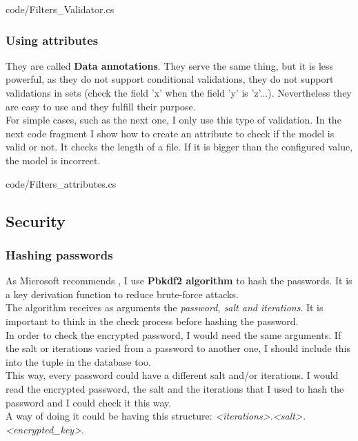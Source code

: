         
        {code/Filters_Validator.cs}

        \subsubsection{Using attributes}
        They are called \textbf{Data annotations}. They serve the same thing, but it is less powerful, as they do not support conditional validations, they do not support validations in sets (check the field 'x' when the field 'y' is 'z'...). Nevertheless they are easy to use and they fulfill their purpose. \\
        For simple cases, such as the next one, I only use this type of validation. In the next code fragment I show how to create an attribute to check if the model is valid or not. It checks the length of a file. If it is bigger than the configured value, the model is incorrect.

        
        {code/Filters_attributes.cs}

    \subsection{Security}
        \subsubsection{Hashing passwords}
        As Microsoft recommends \cite{Hash}, I use \textbf{Pbkdf2 algorithm} to hash the passwords. It is a key derivation function to reduce brute-force attacks. \\

        The algorithm receives as arguments the \textit{password, salt and iterations}. It is important to think in the check process before hashing the password. \\
        In order to check the encrypted password, I would need the same arguments. If the salt or iterations varied from a password to another one, I should include this into the tuple in the database too. \\
        
        This way, every password could have a different salt and/or iterations. I would read the encrypted password, the salt and the iterations that I used to hash the password and I could check it this way. \\
        A way of doing it could be having this structure: \textit{<iterations>.<salt>.<encrypted\_key>}. \\
        
